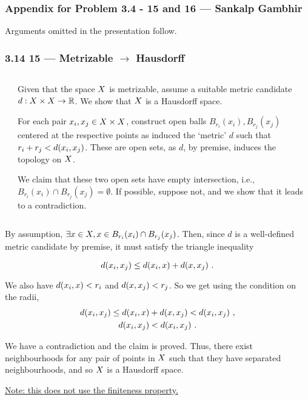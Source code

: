 \begin{frame}
    \frametitle{Appendix for Problem 3.4 - 15 and 16 --- Sankalp Gambhir}

    Arguments omitted in the presentation follow.

\end{frame}

\begin{frame}
    \frametitle{3.14 15 --- Metrizable \(\rightarrow\) Hausdorff}

    \begin{columns}
        \begin{column}{0.3\textwidth}
            \scalebox{0.7}{}            
        \end{column}
        \begin{column}{0.7\textwidth}
            Given that the space \(X\) is metrizable, assume a suitable
            metric candidate \(d: X \times X \to \mathbb{R}\). We show that
            \(X\) is a Hausdorff space.

            For each pair \(x_i, x_j \in X \times X\), construct open
            balls \(B_{r_i}(x_i), B_{r_j}(x_j)\) centered at the respective
            points as induced the `metric' \(d\) such that \(r_i + r_j <
            d(x_i, x_j)\). These are open sets, as \(d\), by premise,
            induces the topology on \(X\).

            We claim that these two open sets have empty intersection, i.e.,
            \(B_{r_i}(x_i) \cap B_{r_j}(x_j) = \emptyset\). If possible, suppose
            not, and we show that it leads to a contradiction. 
        \end{column}
    \end{columns}   

\end{frame}

\begin{frame}    
    By assumption, \(\exists x \in X, x \in B_{r_i}(x_i) \cap
    B_{r_j}(x_j)\). Then, since \(d\) is a well-defined metric candidate by
    premise, it must satisfy the triangle inequality

    \begin{equation*}
        d(x_i, x_j) \leq d(x_i, x) + d(x, x_j)~.
    \end{equation*}

    We also have \(d(x_i, x) < r_i\) and \(d(x, x_j) <
    r_j\). So we get using the condition on the radii,
    \begin{gather*}
        d(x_i, x_j) \leq d(x_i, x) + d(x, x_j) < d(x_i, x_j)~,\\
        d(x_i, x_j) < d(x_i, x_j)~.
    \end{gather*}

    We have a contradiction and the claim is proved. Thus, there exist
    neighbourhoods for any pair of points in \(X\) such that they have
    separated neighbourhoods, and so \(X\) is a Hausdorff space.

    \underline{Note: this does not use the finiteness property.}
\end{frame}

